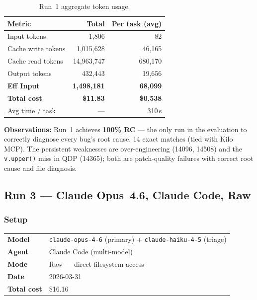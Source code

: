\begin{table}[h]
\centering
\caption{Run~1 aggregate token usage.}\label{tab:r1-tokens}
\begin{tabular}{lrr}
\toprule
\textbf{Metric} & \textbf{Total} & \textbf{Per task (avg)} \\
\midrule
Input tokens         & 1,806       & 82     \\
Cache write tokens   & 1,015,628   & 46,165 \\
Cache read tokens    & 14,963,747  & 680,170 \\
Output tokens        & 432,443     & 19,656 \\
\midrule
\textbf{Eff Input}   & \textbf{1,498,181} & \textbf{68,099} \\
\textbf{Total cost}  & \textbf{\$11.83}   & \textbf{\$0.538} \\
Avg time / task      & ---         & 310\,s \\
\bottomrule
\end{tabular}
\end{table}

\noindent
\textbf{Observations:} Run~1 achieves \textbf{100\% RC} --- the only run in the
evaluation to correctly diagnose every bug's root cause.
14 exact matches (tied with Kilo MCP).
The persistent weaknesses are over-engineering (14096, 14508) and the
\texttt{v.upper()} miss in QDP (14365); both are patch-quality failures
with correct root cause and file diagnosis.

\subsection{Run 3 --- Claude Opus~4.6, Claude Code, Raw}
\label{sec:run3}

\subsubsection{Setup}

\begin{tabular}{ll}
\textbf{Model}     & \texttt{claude-opus-4-6} (primary) + \texttt{claude-haiku-4-5} (triage) \\
\textbf{Agent}     & Claude Code (multi-model) \\
\textbf{Mode}      & Raw --- direct filesystem access \\
\textbf{Date}      & 2026-03-31 \\
\textbf{Total cost} & \$16.16 \\
\end{tabular}

